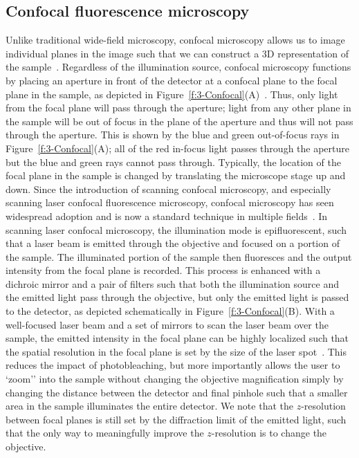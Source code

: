 \subsection{Confocal fluorescence microscopy}
Unlike traditional wide-field microscopy, confocal microscopy allows us to image individual planes in the image such that we can construct a 3D representation of the sample~\cite{RN260}.
Regardless of the illumination source, confocal microscopy functions by placing an aperture in front of the detector at a confocal plane to the focal plane in the sample, as depicted in Figure~\ref{f:3-Confocal}(A)~\cite{RN259}.
Thus, only light from the focal plane will pass through the aperture; light from any other plane in the sample will be out of focus in the plane of the aperture and thus will not pass through the aperture.
This is shown by the blue and green out-of-focus rays in Figure~\ref{f:3-Confocal}(A); all of the red in-focus light passes through the aperture but the blue and green rays cannot pass through.
Typically, the location of the focal plane in the sample is changed by translating the microscope stage up and down.
Since the introduction of scanning confocal microscopy, and especially scanning laser confocal fluorescence microscopy, confocal microscopy has seen widespread adoption and is now a standard technique in multiple fields~\cite{RN261,RN262,RN260}.
In scanning laser confocal microscopy, the illumination mode is epifluorescent, such that a laser beam is emitted through the objective and focused on a portion of the sample.
The illuminated portion of the sample then fluoresces and the output intensity from the focal plane is recorded.
This process is enhanced with a dichroic mirror and a pair of filters such that both the illumination source and the emitted light pass through the objective, but only the emitted light is passed to the detector, as depicted schematically in Figure~\ref{f:3-Confocal}(B).
With a well-focused laser beam and a set of mirrors to scan the laser beam over the sample, the emitted intensity in the focal plane can be highly localized such that the spatial resolution in the focal plane is set by the size of the laser spot~\cite{RN260}.
This reduces the impact of photobleaching, but more importantly allows the user to `zoom'' into the sample without changing the objective magnification simply by changing the distance between the detector and final pinhole such that a smaller area in the sample illuminates the entire detector.
We note that the $z$-resolution between focal planes is still set by the diffraction limit of the emitted light, such that the only way to meaningfully improve the $z$-resolution is to change the objective.
